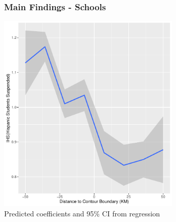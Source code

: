 \documentclass{beamer}
\begin{document}
\begin{frame}
\frametitle{Main Findings - Schools}
\centering
        \includegraphics[width=0.65\textwidth]{../../analysis/Output/graphs/hispanicsuspensions.pdf}\\
\footnotesize Predicted coefficients and 95\% CI from regression
\end{frame}

\end{document}
